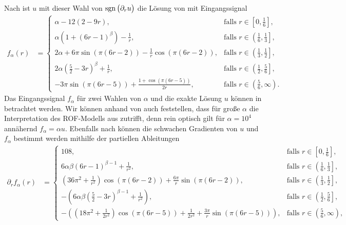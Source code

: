 Nach  ist $u$ mit dieser Wahl von
$\operatorname{sgn}\big(\partial_r u\big)$ die Lösung von  mit
Eingangssignal
\begin{align}
  \label{eq:inputSignalF01}
  f_\alpha(r)
  &=
  \begin{cases}
    \alpha-12(2-9r), 
    & \text{falls } r\in \left[0,\frac{1}{6}\right]\!,\\
    \alpha\left(1+(6r-1)^\beta\right)-\frac{1}{r}, 
    & \text{falls } r\in \left(\frac{1}{6}, \frac{1}{3}\right]\!,\\
    2\alpha+6\pi\sin(\pi(6r-2))-\frac{1}{r}\cos(\pi(6r-2)), 
    & \text{falls } r\in \left(\frac{1}{3}, \frac{1}{2}\right]\!,\\
    2\alpha\left(\frac{5}{2}-3r\right)^\beta+\frac{1}{r},
    & \text{falls } r\in \left(\frac{1}{2}, \frac{5}{6}\right]\!,\\
    -3\pi\sin(\pi(6r-5))+\frac{1+\cos(\pi(6r-5))}{2r}, 
    & \text{falls } r\in \left(\frac{5}{6}, \infty\right)\!.
  \end{cases}
\end{align}
Das Eingangssignal $f_\alpha$ für zwei Wahlen von $\alpha$ und die exakte
Lösung $u$ können in  betrachtet werden.
Wir können anhand von  auch feststellen, dass für große
$\alpha$ die Interpretation des ROF-Modells aus 
zutrifft, denn rein optisch gilt für $\alpha=10^4$ annähernd $f_\alpha=\alpha
u$.
Ebenfalls nach  können die schwachen
Gradienten von $u$ und $f_\alpha$ bestimmt werden mithilfe der partiellen 
Ableitungen
\begin{align*}
  \partial_r f_\alpha(r)
  &=
  \begin{cases}
    108,
    & \text{falls } r\in\left[0,\frac{1}{6}\right]\!,\\
    6\alpha\beta(6r-1)^{\beta-1} +\frac{1}{r^2}, 
    & \text{falls } r\in\left(\frac{1}{6},\frac{1}{3}\right]\!,\\
    \left(36\pi^2+\frac{1}{r^2}\right)\cos(\pi(6r-2))
    + \frac{6\pi}{r}\sin(\pi(6r-2)), 
    & \text{falls } r\in\left(\frac{1}{3},\frac{1}{2}\right]\!,\\
    -\left(6\alpha\beta\left( \frac{5}{2}-3r \right)^{\beta-1}+
    \frac{1}{r^2}\right),
    & \text{falls } r\in\left(\frac{1}{2},\frac{5}{6}\right]\!,\\
    -\left( \left( 18\pi^2+\frac{1}{2r^2} \right)\cos(\pi(6r-5))
    +\frac{1}{2r^2} + \frac{3\pi}{r}\sin(\pi(6r-5))\right)\!, 
    &\text{falls } r\in\left(\frac{5}{6},\infty\right)\!,
  \end{cases}
\end{align*}
